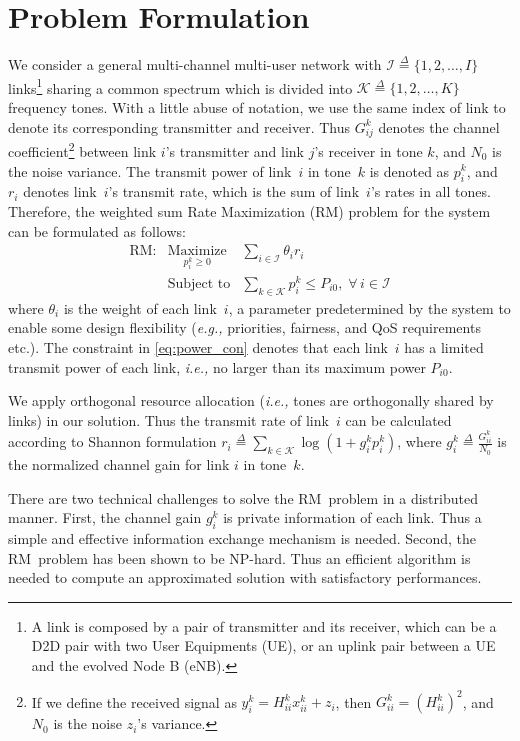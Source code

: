 \documentclass[conference]{IEEEtran}
\newcommand{\mdef}{\overset{\Delta}{=}}
\newcommand{\ie}{\emph{i.e., }}
\newcommand{\eg}{\emph{e.g., }}
\newcommand{\mi}{\mathcal{I}}
\begin{document}
\section{Problem Formulation}
We consider a general multi-channel multi-user network with $\mathcal{I}\mdef\{1,2,\dots,I\}$ links\footnote{A link is composed by a pair of transmitter and its receiver, which can be a D2D pair with two User Equipments (UE), or an uplink pair between a UE and the evolved Node B (eNB).} sharing a common spectrum which is divided into $\mathcal{K}\mdef\{1,2,\dots,K\}$ frequency tones. With a little abuse of notation, we use the same index of link to denote its corresponding transmitter and receiver. Thus $G_{ij}^k$ denotes the channel coefficient\footnote{If we define the received signal as $y^k_i = H^k_{ii} x^k_{ii} + z_i$, then $G^k_{ii}=(H^k_{ii})^2$, and $N_0$ is the noise $z_i$'s variance.} between link $i$'s transmitter and link $j$'s receiver in tone $k$, and $N_0$ is the noise variance. The transmit power of link~$i$ in tone~$k$ is denoted as $p_i^k$, and $r_i$ denotes link~$i$'s transmit rate, which is the sum of link~$i$'s rates in all tones.
Therefore, the weighted sum Rate Maximization (RM) problem for the system can be formulated as follows:
\begin{eqnarray}
\text{RM}: &\underset{p_i^k\ge 0}{\text{Maximize}}&\sum_{i\in \mathcal{I}} \theta_ir_i \nonumber\\
&\text{Subject to}& \sum_{k\in\mathcal{K}}p_i^k\le P_{i0},\;\forall\, i\in\mi \label{eq:power_con}
\end{eqnarray}
where $\theta_i$ is the weight of each link~$i$, a parameter predetermined by the system to enable some design flexibility (\eg priorities, fairness, and QoS requirements etc.). The constraint in \eqref{eq:power_con} denotes that each link~$i$ has a limited transmit power of each link, \ie no larger than its maximum power $P_{i0}$.

We apply orthogonal resource allocation (\ie tones are orthogonally shared by links) in our solution. Thus the transmit rate of link~$i$ can be calculated according to Shannon formulation $r_i\mdef\sum_{k\in\mathcal{K}}\log\left(1+{g_{i}^kp_i^k}\right)$, where $g_i^k\mdef\frac{G_{ii}^k}{N_0}$ is the normalized channel gain for link $i$ in tone~$k$.



There are two technical challenges to  solve the RM~problem in a distributed manner. First, the channel gain $g_i^k$ is private information of each link. Thus a simple and effective information exchange mechanism is needed.
Second, the RM~problem has been shown to be NP-hard\cite{luo2008dynamic}. Thus an efficient algorithm is needed to compute an approximated solution with satisfactory performances.
\end{document}
